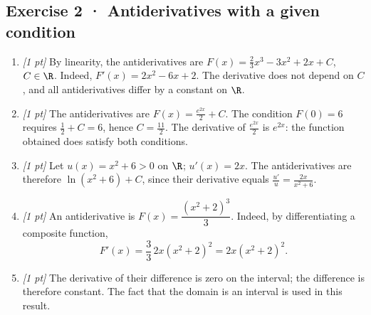 \subsection*{Exercise 2 · Antiderivatives with a given condition}\begin{enumerate}

\item \textit{[1 pt]} By linearity, the antiderivatives are $F(x)=\frac{2}{3}x^3-3x^2+2x+C$, $C\in\R$. Indeed, $F'(x)=2x^2-6x+2$. The derivative does not depend on $C$, and all antiderivatives differ by a constant on $\R$.

\item \textit{[1 pt]} The antiderivatives are $F(x)=\frac{e^{2x}}{2}+C$. The condition $F(0)=6$ requires $\frac{1}{2}+C=6$, hence $C=\frac{11}{2}$. The derivative of $\frac{e^{2x}}{2}$ is $e^{2x}$: the function obtained does satisfy both conditions.

\item \textit{[1 pt]} Let $u(x)=x^2+6>0$ on $\R$; $u'(x)=2x$. The antiderivatives are therefore $\ln(x^2+6)+C$, since their derivative equals $\frac{u'}{u}=\frac{2x}{x^2+6}$.

\item \textit{[1 pt]} An antiderivative is $F(x)=\dfrac{(x^2+2)^{3}}{3}$. Indeed, by differentiating a composite function,
\[F'(x)=\frac{3}{3}\,2x(x^2+2)^{2}=2x(x^2+2)^{2}.\]

\item \textit{[1 pt]} The derivative of their difference is zero on the interval; the difference is therefore constant. The fact that the domain is an interval is used in this result.

\end{enumerate}


